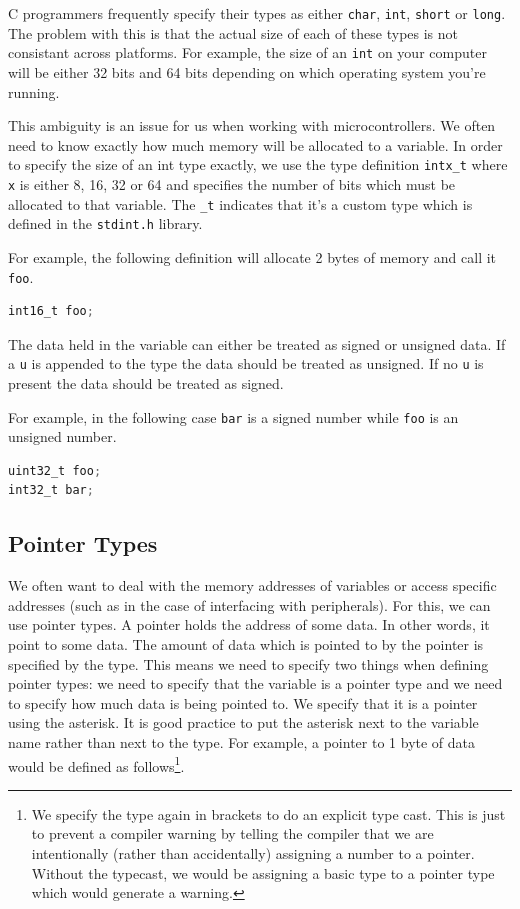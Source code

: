 C programmers frequently specify their types as either \texttt{char}, \texttt{int}, \texttt{short} or \texttt{long}. The problem with this is that the actual size of each of these types is not consistant across platforms. 
For example, the size of an \texttt{int} on your computer will be either 32 bits and 64 bits depending on which operating system you're running.

This ambiguity is an issue for us when working with microcontrollers. We often need to know exactly how much memory will be allocated to a variable. In order to specify the size of an int type exactly, we use the type definition \texttt{intx\_t} where \texttt{x} is either 8, 16, 32 or 64 and specifies the number of bits which must be allocated to that variable. The \texttt{\_t} indicates that it's a custom type which is defined in the \texttt{stdint.h} library. 

For example, the following definition will allocate 2 bytes of memory and call it \texttt{foo}.

\begin{lstlisting}[language=C]
int16_t foo;
\end{lstlisting}

The data held in the variable can either be treated as signed or unsigned data.
If a \texttt{u} is appended to the type the data should be treated as unsigned.
If no \texttt{u} is present the data should be treated as signed.

For example, in the following case \texttt{bar} is a signed number while \texttt{foo} is an unsigned number. 
\begin{lstlisting}[language=C]
uint32_t foo;
int32_t bar;
\end{lstlisting}

\subsection{Pointer Types}
We often want to deal with the memory addresses of variables or access specific addresses (such as in the case of interfacing with peripherals). For this, we can use pointer types. A pointer holds the address of some data. In other words, it point to some data.
The amount of data which is pointed to by the pointer is specified by the type. This means we need to specify two things when defining pointer types: we need to specify that the variable is a pointer type and we need to specify how much data is being pointed to.
We specify that it is a pointer using the asterisk. It is good practice to put the asterisk next to the variable name rather than next to the type.
For example, a pointer to 1 byte of data would be defined as follows\footnote{We specify the type again in brackets to do an explicit type cast. This is just to prevent a compiler warning by telling the compiler that we are intentionally (rather than accidentally) assigning a number to a pointer. Without the typecast, we would be assigning a basic type to a pointer type which would generate a warning.}.

